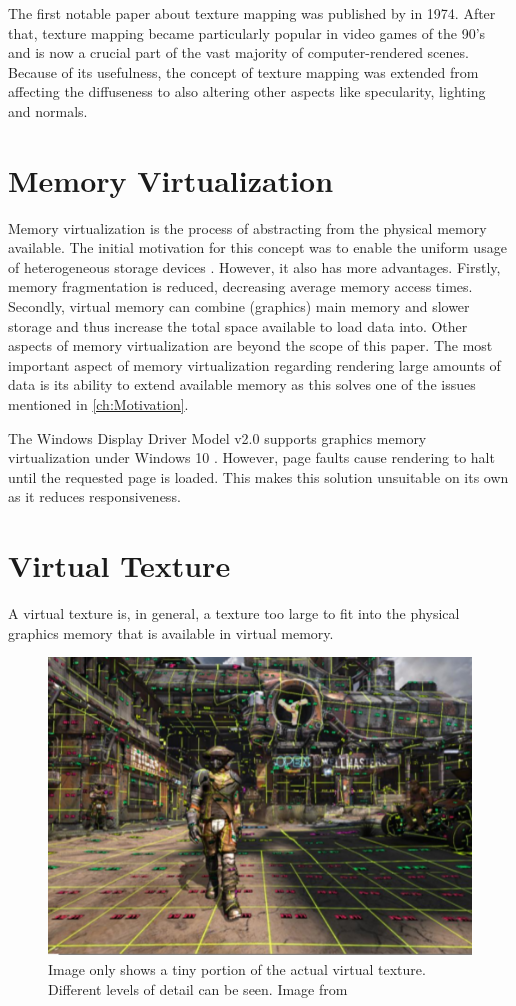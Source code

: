 The first notable paper about texture mapping was published by \cite{catmull1974subdivision} in 1974. After that, texture mapping became particularly popular in video games of the 90's and is now a crucial part of the vast majority of computer-rendered scenes. Because of its usefulness, the concept of texture mapping was extended from affecting the diffuseness to also altering other aspects like specularity, lighting and normals.

\section{Memory Virtualization}

Memory virtualization is the process of abstracting from the physical memory available. The initial motivation for this concept was to enable the uniform usage of heterogeneous storage devices \cite{Euler:VirtualMemoryHistory:2008}. However, it also has more advantages. Firstly, memory fragmentation is reduced, decreasing average memory access times. Secondly, virtual memory can combine (graphics) main memory and slower storage and thus increase the total space available to load data into. Other aspects of memory virtualization are beyond the scope of this paper. The most important aspect of memory virtualization regarding rendering large amounts of data is its ability to extend available memory as this solves one of the issues mentioned in \ref{ch:Motivation}.

The Windows Display Driver Model v2.0 supports graphics memory virtualization under Windows 10 \cite{Microsoft:GPUVirtualMemory:2017}. However, page faults cause rendering to halt until the requested page is loaded. This makes this solution unsuitable on its own as it reduces responsiveness.

\section{Virtual Texture}

A virtual texture is, in general, a texture too large to fit into the physical graphics memory that is available in virtual memory. 

\begin{figure}[h]
  \begin{center}
    \includegraphics[width=.3\textwidth]{logos/virtual_texture_example.png}
    \caption{Image only shows a tiny portion of the actual virtual texture. Different levels of detail can be seen. Image from \cite{van2009id}}
  \end{center}
\end{figure}

